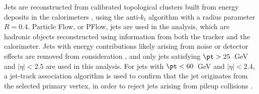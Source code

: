 

Jets are reconstructed from calibrated topological clusters built from energy deposits in the calorimeters \cite{ATL-PHYS-PUB-2015-015}, using the anti-$k_t$ algorithm with a radius parameter $R=0.4$. Particle Flow, or PFlow, jets are used in the analysis, which are hadronic objects reconstructed using information from both the tracker and the calorimeter. Jets with energy contributions likely arising from noise or detector effects are removed from consideration \cite{ATLAS-CONF-2015-029}, and only jets satisfying $\pt > 25$~GeV and $|\eta| < 2.5$ are used in this analysis.  For jets with $\pt < 60$~GeV and $|\eta| < 2.4$, a jet-track association algorithm is used to confirm that the jet originates from the selected primary vertex, in order to reject jets arising from pileup collisions \cite{PERF-2014-03}.


